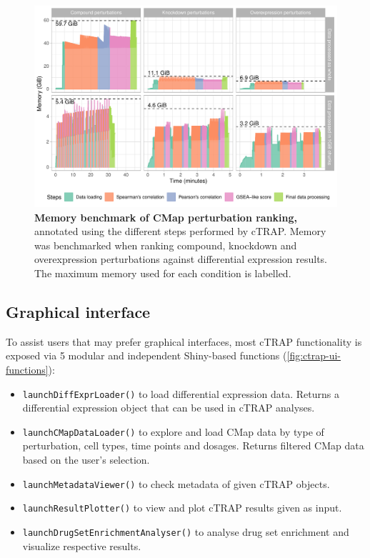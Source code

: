 \begin{figure}[!ht]
  \vspace{-\intextsep}
  \includegraphics[width=\textwidth]{images/ctrap/ranking-memory}
  \centering
  \vspace{-\intextsep}
  \caption[Memory benchmark of CMap perturbation ranking]{\textbf{Memory benchmark of CMap perturbation ranking,} annotated using the different steps performed by cTRAP. Memory was benchmarked when ranking compound, knockdown and overexpression perturbations against differential expression results. The maximum memory used for each condition is labelled.}
  \label{fig:cmap-ranking-memory}
\end{figure}

\subsection{Graphical interface}

To assist users that may prefer graphical interfaces, most cTRAP functionality is exposed via 5 modular and independent Shiny-based functions (\autoref{fig:ctrap-ui-functions}):

\begin{itemize}
	\item \texttt{launchDiffExprLoader()} to load differential expression data. Returns a differential expression object that can be used in cTRAP analyses.
	\item \texttt{launchCMapDataLoader()} to explore and load CMap data by type of perturbation, cell types, time points and dosages. Returns filtered CMap data based on the user's selection.
	\item \texttt{launchMetadataViewer()} to check metadata of given cTRAP objects.
	\item \texttt{launchResultPlotter()} to view and plot cTRAP results given as input.
	\item \texttt{launchDrugSetEnrichmentAnalyser()} to analyse drug set enrichment and visualize respective results.
\end{itemize}

